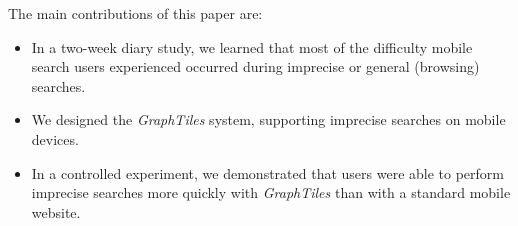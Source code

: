 The main contributions of this paper are:
\begin{itemize}
\item In a two-week diary study, we learned that most of the difficulty mobile search users experienced occurred during imprecise or general (browsing) searches.  
\item We designed the \textit{GraphTiles} system, supporting imprecise searches on mobile devices.
\item In a controlled experiment, we demonstrated that users were able to perform imprecise searches more quickly with \textit{GraphTiles} than with a standard mobile website.
\end{itemize}


